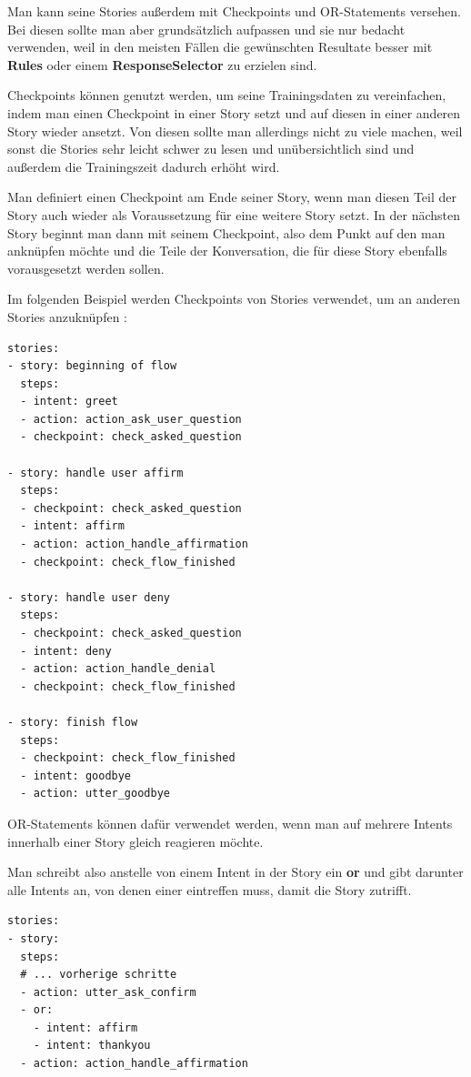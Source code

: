 Man kann seine Stories außerdem mit Checkpoints und OR-Statements versehen.
Bei diesen sollte man aber grundsätzlich aufpassen und sie nur bedacht verwenden, weil in den meisten Fällen die gewünschten Resultate besser mit \textbf{Rules} oder einem \textbf{ResponseSelector} zu erzielen sind.
\cite{checkpointsor}

Checkpoints können genutzt werden, um seine Trainingsdaten zu vereinfachen, indem man einen Checkpoint in einer Story setzt und auf diesen in einer anderen Story wieder ansetzt.
Von diesen sollte man allerdings nicht zu viele machen, weil sonst die Stories sehr leicht schwer zu lesen und unübersichtlich sind und außerdem die Trainingszeit dadurch erhöht wird.
\cite{checkpoints}

Man definiert einen Checkpoint am Ende seiner Story, wenn man diesen Teil der Story auch wieder als Voraussetzung für eine weitere Story setzt.
In der nächsten Story beginnt man dann mit seinem Checkpoint, also dem Punkt auf den man anknüpfen möchte und die Teile der Konversation, die für diese Story ebenfalls vorausgesetzt werden sollen.

Im folgenden Beispiel werden Checkpoints von Stories verwendet, um an anderen Stories anzuknüpfen\cite{checkpoints}
:

\begin{lstlisting}[label={lst: Checkpoints Example}]
stories:
- story: beginning of flow
  steps:
  - intent: greet
  - action: action_ask_user_question
  - checkpoint: check_asked_question

- story: handle user affirm
  steps:
  - checkpoint: check_asked_question
  - intent: affirm
  - action: action_handle_affirmation
  - checkpoint: check_flow_finished

- story: handle user deny
  steps:
  - checkpoint: check_asked_question
  - intent: deny
  - action: action_handle_denial
  - checkpoint: check_flow_finished

- story: finish flow
  steps:
  - checkpoint: check_flow_finished
  - intent: goodbye
  - action: utter_goodbye
\end{lstlisting}

OR-Statements können dafür verwendet werden, wenn man auf mehrere Intents innerhalb einer Story gleich reagieren möchte.
\cite{orStatements}

Man schreibt also anstelle von einem Intent in der Story ein \textbf{or} und gibt darunter alle Intents an, von denen einer eintreffen muss, damit die Story zutrifft.

\begin{lstlisting}[label={lst: OR Example}]
stories:
- story:
  steps:
  # ... vorherige schritte
  - action: utter_ask_confirm
  - or:
    - intent: affirm
    - intent: thankyou
  - action: action_handle_affirmation
\end{lstlisting}

